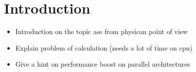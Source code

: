 \section{Introduction}
	\begin{itemize}
	\item Introduction on the topic ase from physican point of view
	\item Explain problem of calculation (needs a lot of time on cpu)
	\item Give a hint on performance boost on parallel architectures
	\end{itemize}
